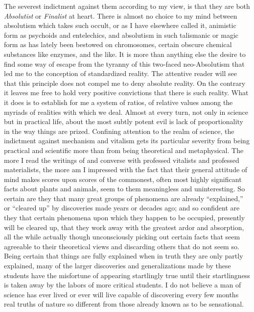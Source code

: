 \documentclass[a4paper, 11pt, oneside, polutonikogreek, english]{article}
\begin{document}
The severest indictment against them according to my view, is that they are both \emph{Absolutist} or \emph{Finalist} at heart. There is almost no choice to my mind between absolutism which takes such occult, or as I have elsewhere called it, animistic form as psychoids and entelechics, and absolutism in such talismanic or magic form as has lately been bestowed on chromosomes, certain obscure chemical substances like enzymes, and the like. It is more than anything else the desire to find some way of escape from the tyranny of this two-faced neo-Absolutism that led me to the conception of standardized reality. The attentive reader will see that this principle does not compel me to deny absolute reality. On the contrary it leaves me free to hold very positive convictions that there is such reality. What it does is to establish for me a system of ratios, of relative values among the myriads of realities with which we deal. Almost at every turn, not only in science but in practical life, about the most subtly potent evil is lack of proportionality in the way things are prized. Confining attention to the realm of science, the indictment against mechanism and vitalism gets its particular severity from being practical and scientific more than from being theoretical and metaphysical. The more I read the writings of and converse with professed vitalists and professed materialists, the more am I impressed with the fact that their general attitude of mind makes scores upon scores of the commonest, often most highly significant facts about plants and animals, seem to them meaningless and uninteresting. So certain are they that many great groups of phenomena are already ``explained,'' or ``cleared up'' by discoveries made years or decades ago; and so confident are they that certain phenomena upon which they happen to be occupied, presently will be cleared up, that they work away with the greatest ardor and absorption, all the while actually though unconsciously picking out certain facts that seem agreeable to their theoretical views and discarding others that do not seem so. Being certain that things are fully explained when in truth they are only partly explained, many of the larger discoveries and generalizations made by these students have the misfortune of appearing startlingly true until their startlingness is taken away by the labors of more critical students. I do not believe a man of science has ever lived or ever will live capable of discovering every few months real truths of nature so different from those already known as to be sensational.
\end{document}
